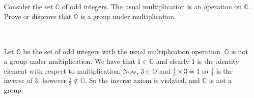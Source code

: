 Consider the set $\mathbb{O}$ of odd integers. The usual multiplication is an operation on $\mathbb{O}$.
Prove or disprove that $\mathbb{O}$ is a group under multiplication.\\\\

\begin{solution}\renewcommand{\qedsymbol}{}\ \\
    Let $\mathbb{O}$ be the set of odd integers with the usual multiplication operation. $\mathbb{O}$ is
    not a group under multiplication. We have that $1\in\mathbb{O}$ and clearly $1$ is the identity
    element with respect to multiplication. Now, $3\in\mathbb{O}$ and $\frac13\times3=1$ so $\frac13$ is
    the inverse of $3$, however $\frac13\notin\mathbb{O}$. So the inverse axiom is violated, and
    $\mathbb{O}$ is not a group.

\end{solution}